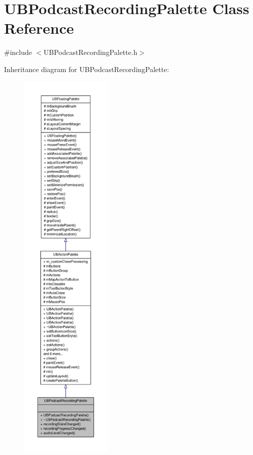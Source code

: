 \hypertarget{class_u_b_podcast_recording_palette}{\section{U\-B\-Podcast\-Recording\-Palette Class Reference}
\label{d1/d3c/class_u_b_podcast_recording_palette}
}


{\ttfamily \#include $<$U\-B\-Podcast\-Recording\-Palette.\-h$>$}



Inheritance diagram for U\-B\-Podcast\-Recording\-Palette\-:
\nopagebreak
\begin{figure}[H]
\begin{center}
\leavevmode
\includegraphics[height=550pt]{d5/d7f/class_u_b_podcast_recording_palette__inherit__graph}
\end{center}
\end{figure}


